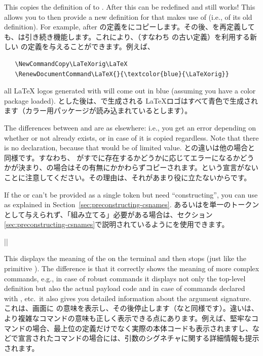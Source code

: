 \documentclass{ltxguide}
\newcommand\jpnewline{\vspace{3pt}\newline}
\DeclareRobustCommand{\jpquote}[1]{「#1」}
\begin{document}
This copies the definition of  to . After
this  can be redefined and 
still works! This allows you to then provide a new definition for
 that makes use of  (i.e., of its old
definition). For example, after
\jpnewline
{}の定義をにコピーします。その後、を再定義しても、は引き続き機能します。これにより、（すなわち の古い定義）を利用する新しい の定義を与えることができます。例えば、
\begin{verbatim}
   \NewCommandCopy\LaTeXorig\LaTeX
   \RenewDocumentCommand\LaTeX{}{\textcolor{blue}{\LaTeXorig}}
\end{verbatim}
all \LaTeX{} logos generated with  will come out in blue
(assuming you have a color package loaded).
\jpnewline
とした後は、で生成される \LaTeX{}ロゴはすべて青色で生成されます（カラー用パッケージが読み込まれているとします）。

The differences between  and  are as
elsewhere: i.e., you get an error depending on whether or not
 already exists, or in case of  it is copied
regardless. Note that there is no  declaration, because
that would be of limited value.
\jpnewline
{}との違いは他の場合と同様です。すなわち、 がすでに存在するかどうかに応じてエラーになるかどうかが決まり、の場合はその有無にかかわらずコピーされます。という宣言がないことに注意してください。その理由は、それがあまり役に立たないからです。


If the  or  can't be provided as a single
token but need \enquote{constructing}, you can use 
as explained in
Section~\ref{sec:preconstructing-csnames}.
\jpnewline
{}あるいはを単一のトークンとして与えられず、\jpquote{組み立てる}必要がある場合は、セクション\ref{sec:preconstructing-csnames}で説明されているようにを使用できます。

\begin{decl}
  |\ShowCommand|       
\end{decl}

This displays the meaning of the  on the terminal and then
stops (just like the primitive ). The difference is that it
correctly shows the meaning of more complex commands, e.g., in case of
robust commands it displays not only the top-level definition but
also the actual payload code and in case of commands declared with
, etc.\ it also gives you detailed information
about the argument signature.
\jpnewline
これは、画面に の意味を表示し、その後停止します（なと同様です）。違いは、より複雑なコマンドの意味も正しく表示できる点にあります。例えば、堅牢なコマンドの場合、最上位の定義だけでなく実際の本体コードも表示されますし、などで宣言されたコマンドの場合には、引数のシグネチャに関する詳細情報も提示されます。
\end{document}
